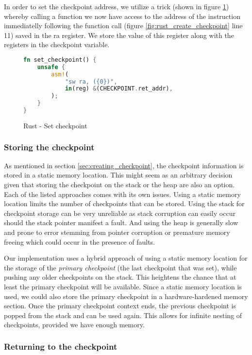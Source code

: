 In order to set the checkpoint address, we utilize a trick (shown in figure \ref{fig:rust_set_checkpoint}) whereby calling a function we now have access to the address of the instruction immediatelly following the function call (figure \ref{fig:rust_create_checkpoint} line 11) saved in the \acrshort{ra} register. We store the value of this register along with the registers in the checkpoint variable.

\begin{figure}[!h]
\begin{lstlisting}[language=Rust]
fn set_checkpoint() {
    unsafe {
        asm!(
            "sw ra, ({0})",
            in(reg) &(CHECKPOINT.ret_addr),
        );
    }
}
\end{lstlisting}
\caption{Rust - Set checkpoint}
\label{fig:rust_set_checkpoint}
\end{figure}

\subsubsection{Storing the checkpoint}

As mentioned in section \ref{sec:creating_checkpoint}, the checkpoint information is stored in a static memory location. This might seem as an arbitrary decision given that storing the checkpoint on the stack or the heap are also an option. Each of the listed approaches comes with its own issues. Using a static memory location limits the number of checkpoints that can be stored. Using the stack for checkpoint storage can be very unreliable as stack corruption can easily occur should the stack pointer manifest a fault. And using the heap is generally slow and prone to error stemming from pointer corruption or premature memory freeing which could occur in the presence of faults.

Our implementation uses a hybrid approach of using a static memory location for the storage of the \textit{primary checkpoint} (the last checkpoint that was set), while pushing any older checkpoints on the stack. This heightens the chance that at least the primary checkpoint will be available. Since a static memory location is used, we could also store the primary checkpoint in a hardware-hardened memory section. Once the primary checkpoint context ends, the previous checkpoint is popped from the stack and can be used again. This allows for infinite nesting of checkpoints, provided we have enough memory.

\subsubsection{Returning to the checkpoint}

